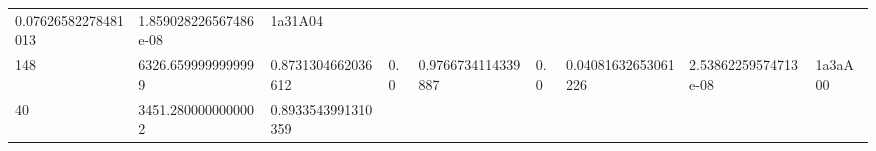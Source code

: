 \documentclass[11pt,a4paper,twoside]{book}
\theoremstyle{definition}
\theoremstyle{definition}
\theoremstyle{remark}
\begin{document}
\begin{longtable}[]{@{}lllllllll@{}}
\begin{minipage}[t]{0.04\columnwidth}
0.07626582278481013\strut
\end{minipage} & \begin{minipage}[t]{0.04\columnwidth}\raggedright\strut
1.859028226567486e-08\strut
\end{minipage} & \begin{minipage}[t]{0.04\columnwidth}\raggedright\strut
1a31A04\strut
\end{minipage}\tabularnewline
\begin{minipage}[t]{0.04\columnwidth}\raggedright\strut
148\strut
\end{minipage} & \begin{minipage}[t]{0.04\columnwidth}\raggedright\strut
6326.6599999999999\strut
\end{minipage} & \begin{minipage}[t]{0.04\columnwidth}\raggedright\strut
0.8731304662036612\strut
\end{minipage} & \begin{minipage}[t]{0.04\columnwidth}\raggedright\strut
0.0\strut
\end{minipage} & \begin{minipage}[t]{0.04\columnwidth}\raggedright\strut
0.9766734114339887\strut
\end{minipage} & \begin{minipage}[t]{0.04\columnwidth}\raggedright\strut
0.0\strut
\end{minipage} & \begin{minipage}[t]{0.04\columnwidth}\raggedright\strut
0.04081632653061226\strut
\end{minipage} & \begin{minipage}[t]{0.04\columnwidth}\raggedright\strut
2.53862259574713e-08\strut
\end{minipage} & \begin{minipage}[t]{0.04\columnwidth}\raggedright\strut
1a3aA00\strut
\end{minipage}\tabularnewline
\begin{minipage}[t]{0.04\columnwidth}\raggedright\strut
40\strut
\end{minipage} & \begin{minipage}[t]{0.04\columnwidth}\raggedright\strut
3451.2800000000002\strut
\end{minipage} & \begin{minipage}[t]{0.04\columnwidth}\raggedright\strut
0.8933543991310359\strut
\end{minipage} & \begin{minipage}[t]{0.04\columnwidth}\raggedright\strut

\end{minipage}
\end{longtable}
\end{document}
